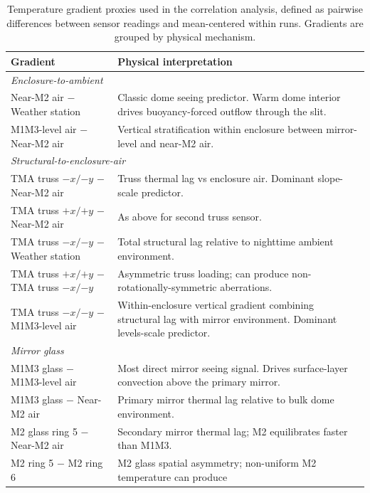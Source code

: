 \documentclass[SE,authoryear,toc]{lsstdoc}
\begin{document}
\begin{table}[htbp]
\centering
\small
\caption{Temperature gradient proxies used in the correlation analysis,
         defined as pairwise differences between sensor readings and
         mean-centered within runs. Gradients are grouped by physical
         mechanism.}
\label{tab:gradients}
\begin{tabular}{l >{\raggedright\arraybackslash}p{6.5cm}}
\toprule
\textbf{Gradient} & \textbf{Physical interpretation} \\
\midrule
\multicolumn{2}{l}{\textit{Enclosure-to-ambient}} \\[2pt]
Near-M2 air $-$ Weather station
    & Classic dome seeing predictor. Warm dome interior drives
      buoyancy-forced outflow through the slit. \\[3pt]
M1M3-level air $-$ Near-M2 air
    & Vertical stratification within enclosure between mirror-level
      and near-M2 air. \\[6pt]
\multicolumn{2}{l}{\textit{Structural-to-enclosure-air}} \\[2pt]
TMA truss $-x/{-y}$ $-$ Near-M2 air
    & Truss thermal lag vs enclosure air. Dominant slope-scale predictor. \\[3pt]
TMA truss $+x/{+y}$ $-$ Near-M2 air
    & As above for second truss sensor. \\[3pt]
TMA truss $-x/{-y}$ $-$ Weather station
    & Total structural lag relative to nighttime ambient environment. \\[3pt]
TMA truss $+x/{+y}$ $-$ TMA truss $-x/{-y}$
    & Asymmetric truss loading; can produce non-rotationally-symmetric
      aberrations. \\[3pt]
TMA truss $-x/{-y}$ $-$ M1M3-level air
    & Within-enclosure vertical gradient combining structural lag with
      mirror environment. Dominant levels-scale predictor. \\[6pt]
\multicolumn{2}{l}{\textit{Mirror glass}} \\[2pt]
M1M3 glass $-$ M1M3-level air
    & Most direct mirror seeing signal. Drives surface-layer convection
      above the primary mirror. \\[3pt]
M1M3 glass $-$ Near-M2 air
    & Primary mirror thermal lag relative to bulk dome environment. \\[3pt]
M2 glass ring 5 $-$ Near-M2 air
    & Secondary mirror thermal lag; M2 equilibrates faster than M1M3. \\[3pt]
M2 ring 5 $-$ M2 ring 6
    & M2 glass spatial asymmetry; non-uniform M2 temperature can produce

\end{tabular}
\end{table}
\end{document}
